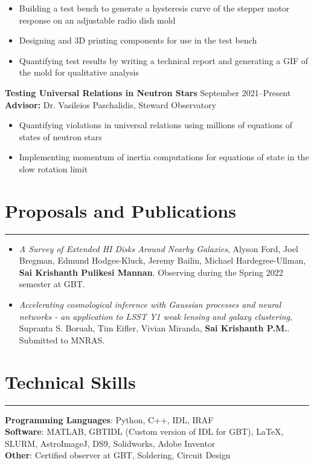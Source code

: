 \documentclass[11pt]{article}
\newcommand{\resumesection}[1]{\vspace{-0.2cm}\section*{#1}\vspace{-0.2cm}\hrule\vspace{0.2cm}}
\begin{document}
\begin{itemize}
	\item Building a test bench to generate a hysteresis curve of the stepper motor response on an adjustable radio dish mold
	\item Designing and 3D printing components for use in the test bench
	\item Quantifying test results by writing a technical report and generating a GIF of the mold for qualitative analysis
\end{itemize}
\textbf{Testing Universal Relations in Neutron Stars}  \hfill September 2021--Present
\\\textbf{Advisor:} Dr. Vasileios Paschalidis, Steward Observatory
\begin{itemize}
	\item Quantifying violations in universal relations using millions of equations of states of neutron stars 
	\item Implementing momentum of inertia computations for equations of state in the slow rotation limit
\end{itemize}

\resumesection{Proposals and Publications}

\begin{itemize}
	\item \textit{A Survey of Extended HI Disks Around Nearby Galaxies}, Alyson Ford, Joel Bregman, Edmund Hodges-Kluck, Jeremy Bailin, Michael Hardegree-Ullman, \textbf{Sai Krishanth Pulikesi Mannan}. Observing during the Spring 2022 semester at GBT. 
	\item \textit{Accelerating cosmological inference with Gaussian processes and neural
	networks - an application to LSST Y1 weak lensing and galaxy clustering}, Supranta S. Boruah, Tim Eifler, Vivian Miranda, \textbf{Sai Krishanth P.M.}. Submitted to MNRAS. 
\end{itemize}

\resumesection{Technical Skills}

\textbf{Programming Languages}: Python, C++, IDL, IRAF 
\\
\textbf{Software}: MATLAB, GBTIDL (Custom version of IDL for GBT), \LaTeX, SLURM, AstroImageJ, DS9, Solidworks, Adobe Inventor
\\
\textbf{Other}: Certified observer at GBT, Soldering, Circuit Design
\end{document}
